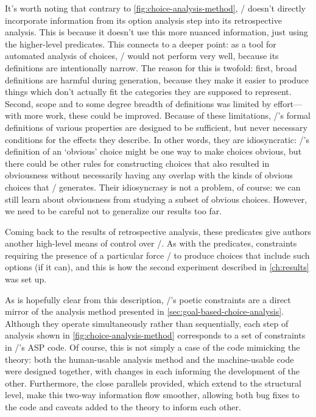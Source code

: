 \begin{enumerate}
It's worth noting that contrary to \cref{fig:choice-analysis-method}, \dunyazad/ doesn't directly incorporate information from its option analysis step into its retrospective analysis.
%
This is because it doesn't use this more nuanced information, just using the higher-level  predicates.
%
This connects to a deeper point: as a tool for automated analysis of choices, \dunyazad/ would not perform very well, because its definitions are intentionally narrow.
%
The reason for this is twofold: first, broad definitions are harmful during generation, because they make it easier to produce things which don't actually fit the categories they are supposed to represent.
%
Second, scope and to some degree breadth of definitions was limited by effort---with more work, these could be improved.
%
Because of these limitations, \dunyazad/'s formal definitions of various properties are designed to be sufficient, but never necessary conditions for the effects they describe.
%
In other words, they are idiosyncratic: \dunyazad/'s definition of an `obvious' choice might be one way to make choices obvious, but there could be other rules for constructing choices that also resulted in obviousness without necessarily having any overlap with the kinds of obvious choices that \dunyazad/ generates.
%
Their idiosyncrasy is not a problem, of course: we can still learn about obviousness from studying a subset of obvious choices.
%
However, we need to be careful not to generalize our results too far.


Coming back to the results of retrospective analysis, these  predicates give authors another high-level means of control over \dunyazad/.
%
As with the  predicates, constraints requiring the presence of a particular  force \dunyazad/ to produce choices that include such options (if it can), and this is how the second experiment described in \cref{ch:results} was set up.

\end{enumerate}


As is hopefully clear from this description, \dunyazad/'s poetic constraints are a direct mirror of the analysis method presented in \cref{sec:goal-based-choice-analysis}.
%
Although they operate simultaneously rather than sequentially, each step of analysis shown in \cref{fig:choice-analysis-method} corresponds to a set of constraints in \dunyazad/'s ASP code.
%
Of course, this is not simply a case of the code mimicking the theory: both the human-usable analysis method and the machine-usable code were designed together, with changes in each informing the development of the other.
%
Furthermore, the close parallels provided, which extend to the structural level, make this two-way information flow smoother, allowing both bug fixes to the code and caveats added to the theory to inform each other.


